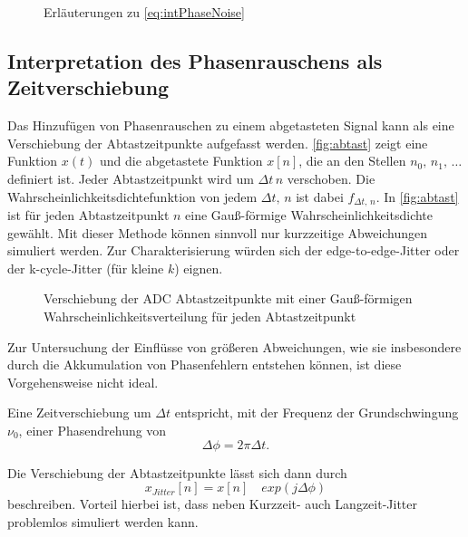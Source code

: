 \begin{figure}[H]
	\centering
	\caption[Umrechnung Phasenrauschen zu Jitter]{Erläuterungen zu \autoref{eq:intPhaseNoise}}
	\label{fig:phaseNoiseInt}
\end{figure}

\subsection{Interpretation des Phasenrauschens als Zeitverschiebung}
Das Hinzufügen von Phasenrauschen zu einem abgetasteten Signal kann als eine Verschiebung der Abtastzeitpunkte aufgefasst werden. \autoref{fig:abtast} zeigt eine Funktion $x(t)$ und die abgetastete Funktion $x[n]$, die an den Stellen $n_0,\,n_1,\,\dots$ definiert ist. Jeder Abtastzeitpunkt wird um $\Delta t\,n$ verschoben. Die Wahrscheinlichkeitsdichtefunktion von jedem $\Delta t,\,n$ ist dabei $f_{\Delta t,\,n}$. In \autoref{fig:abtast} ist für jeden Abtastzeitpunkt $n$ eine Gauß-förmige Wahrscheinlichkeitsdichte gewählt. Mit dieser Methode können sinnvoll nur kurzzeitige Abweichungen simuliert werden. Zur Charakterisierung würden sich der edge-to-edge-Jitter oder der k-cycle-Jitter (für kleine $k$) eignen.

\begin{figure}[H]
	\centering
	\caption[Verschiebung der ADC Abtastzeitpunkte]{Verschiebung der ADC Abtastzeitpunkte mit einer Gauß-förmigen Wahrscheinlichkeitsverteilung für jeden Abtastzeitpunkt}
	\label{fig:abtast}
\end{figure}

Zur Untersuchung der Einflüsse von größeren Abweichungen, wie sie insbesondere durch die Akkumulation von Phasenfehlern entstehen können, ist diese Vorgehensweise nicht ideal.

Eine Zeitverschiebung um $\Delta t$ entspricht, mit der Frequenz der Grundschwingung $\nu_0$, einer Phasendrehung von
\begin{equation}
\Delta \phi = 2 \pi \Delta t.
\end{equation}

Die Verschiebung der Abtastzeitpunkte lässt sich dann durch
\begin{equation}
x_{Jitter}[n] = x[n] \quad exp(j \Delta \phi)
\end{equation}
beschreiben. Vorteil hierbei ist, dass neben Kurzzeit- auch Langzeit-Jitter problemlos simuliert werden kann.

